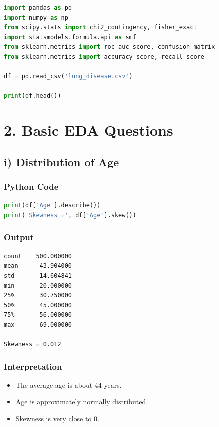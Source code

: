 \documentclass[12pt]{article}
\begin{document}
\begin{lstlisting}[language=Python]
import pandas as pd
import numpy as np
from scipy.stats import chi2_contingency, fisher_exact
import statsmodels.formula.api as smf
from sklearn.metrics import roc_auc_score, confusion_matrix
from sklearn.metrics import accuracy_score, recall_score

df = pd.read_csv('lung_disease.csv')

print(df.head())
\end{lstlisting}

\section*{2. Basic EDA Questions}

\subsection*{i) Distribution of Age}

\subsubsection*{Python Code}

\begin{lstlisting}[language=Python]
print(df['Age'].describe())
print('Skewness =', df['Age'].skew())
\end{lstlisting}

\subsubsection*{Output}

\begin{verbatim}
count    500.000000
mean      43.904000
std       14.604841
min       20.000000
25%       30.750000
50%       45.000000
75%       56.000000
max       69.000000

Skewness = 0.012
\end{verbatim}

\subsubsection*{Interpretation}

\begin{itemize}
\item The average age is about 44 years.
\item Age is approximately normally distributed.
\item Skewness is very close to 0.
\end{itemize}
\end{document}
